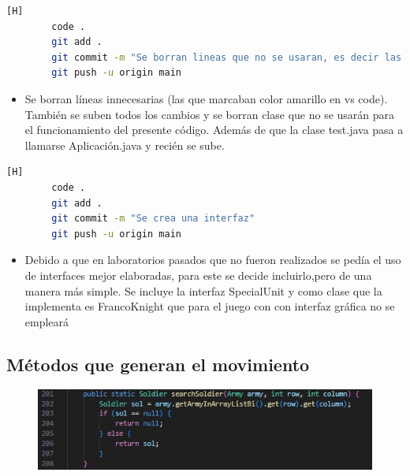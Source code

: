 \documentclass{article}
\begin{document}
	
	
	
	\begin{lstlisting}[language=bash,caption={Commit: 9b67006f46efdfb1cc92fbb419f399d028db2213 }][H]
		code .
		git add .
		git commit -m "Se borran lineas que no se usaran, es decir las de color amarillo, ademas se corrigen ciertos detalles"			
		git push -u origin main
	\end{lstlisting}
	
	
	\begin{itemize}
		\item Se borran líneas innecesarias (las que marcaban color amarillo en vs code). También se suben todos los cambios y se borran clase que no se usarán para el funcionamiento del presente código.  Además de que la clase test.java pasa a llamarse Aplicación.java y recién se sube.
	\end{itemize}
	
	
	
	\begin{lstlisting}[language=bash,caption={Commit: af25af9eba9738c387d5278b1dad3f96ea09b9dd }][H]
		code .
		git add .
		git commit -m "Se crea una interfaz"			
		git push -u origin main
	\end{lstlisting}
	
	
	\begin{itemize}
		\item Debido a que en laboratorios pasados que no fueron realizados se pedía el uso de interfaces mejor elaboradas, para este se decide incluirlo,pero de una manera más simple. Se incluye la interfaz SpecialUnit y como clase que la implementa es  FrancoKnight que para el juego con con interfaz gráfica no se empleará
	\end{itemize}
	
	
	
	
	
	

	\subsection{Métodos que generan el movimiento}
	
	
	
	\begin{figure}[H]
		\centering
		\includegraphics[width=1\textwidth,keepaspectratio]{img/search.jpg}
	\end{figure}
	
\end{document}
